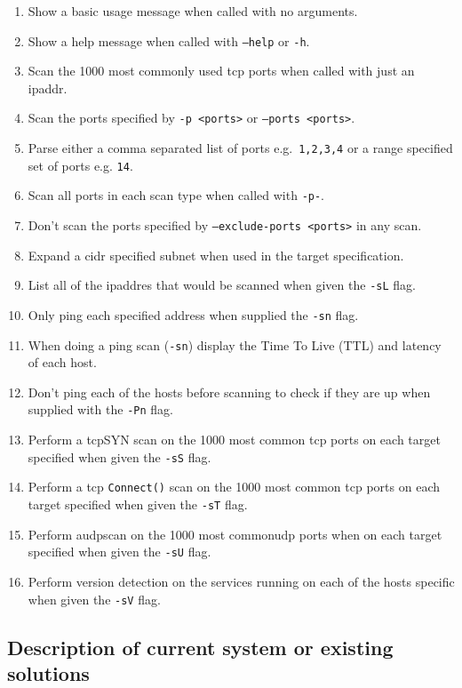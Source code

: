 \documentclass[titlepage]{article}
\let\Oldsubsection\subsection{}
\renewcommand{\subsection}{\FloatBarrier\Oldsubsection}
\begin{document}
\begin{enumerate}
\item{Show a basic usage message when called with no arguments.}
\item{Show a help message when called with \texttt{--help} or \texttt{-h}.}
\item{Scan the 1000 most commonly used \gls{tcp} \glspl{port} when called with just an \gls{ipaddr}.}
\item{Scan the \glspl{port} specified by \texttt{-p <ports>} or \texttt{--ports <ports>}.}
\item{Parse either a comma separated list of \glspl{port} e.g.\ \texttt{1,2,3,4} or a range specified set of \glspl{port} e.g.
  \texttt{1{\textendash}4}}.
\item{Scan all \glspl{port} in each scan type when called with \texttt{-p-}.}
\item{Don't scan the \glspl{port} specified by \texttt{--exclude-ports <ports>} in any scan.}
\item{Expand a \gls{cidr} specified \gls{subnet} when used in the target specification.}
\item{List all of the \gls{ipaddr}es that would be scanned when given the \texttt{-sL} flag.}
\item{Only ping each specified address when supplied the \texttt{-sn} flag.}
\item{When doing a ping scan (\texttt{-sn}) display the Time To Live (TTL) and latency of each host.}
\item{Don't ping each of the hosts before scanning to check if they are up when supplied with the \texttt{-Pn} flag.}
\item{Perform a \gls{tcp}SYN scan on the 1000 most common \gls{tcp} \glspl{port} on each target specified when given the \texttt{-sS} flag.}
\item{Perform a \gls{tcp} \verb|Connect()| scan on the 1000 most common \gls{tcp} \glspl{port} on each target specified when given the \texttt{-sT} flag.}
\item{Perform a\gls{udp}scan on the 1000 most common\gls{udp} \glspl{port} when on each target specified when given the \texttt{-sU} flag.}
\item{Perform version detection on the \glspl{service} running on each of the hosts specific when given the \texttt{-sV} flag.}
\end{enumerate}

\subsection{Description of current system or existing solutions}
\end{document}
